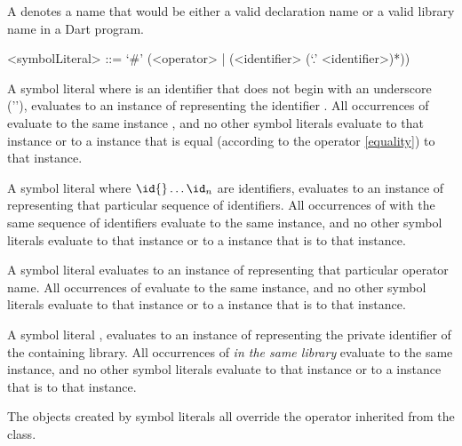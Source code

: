 \documentclass[makeidx]{article}
\begin{document}
\LMHash{}%
A 
denotes a name that would be either
a valid declaration name or a valid library name in a Dart program.

\begin{grammar}
<symbolLiteral> ::= `#' (<operator> | (<identifier> (`.' <identifier>)*))
\end{grammar}

\LMHash{}%
A symbol literal \code{\#\id} where \id{} is an identifier
that does not begin with an underscore ('\code{\_}'),
evaluates to an instance of  representing the identifier \id.
All occurrences of \code{\#\id} evaluate to the same instance
,
and no other symbol literals evaluate to that  instance
or to a  instance that is equal
(according to the \code{==} operator \ref{equality}) to that instance.

\LMHash{}%
A symbol literal 
where $\id{} \ldots \id_n$ are identifiers,
evaluates to an instance of  representing that particular sequence of identifiers.
All occurrences of  with the same sequence of identifiers
evaluate to the same instance,
and no other symbol literals evaluate to that  instance
or to a  instance that is \code{==} to that instance.

\LMHash{}%
A symbol literal  evaluates to an instance of 
representing that particular operator name.
All occurrences of  evaluate to the same instance,
and no other symbol literals evaluate to that  instance
or to a  instance that is \code{==} to that instance.

\LMHash{}%
A symbol literal \code{\#\_\id}, evaluates to an instance of 
representing the private identifier \code{\_\id} of the containing library.
All occurrences of \code{\#\_\id} \emph{in the same library} evaluate to the same instance,
and no other symbol literals evaluate to that  instance
or to a  instance that is \code{==} to that instance.

\LMHash{}%
The objects created by symbol literals all override
the \code{==} operator inherited from the  class.
\end{document}
